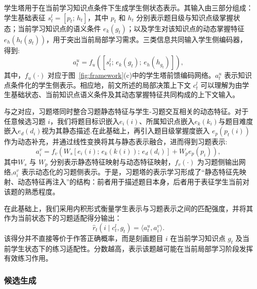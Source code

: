 \documentclass[11pt,a4paper]{article}
\begin{document}
学生塔用于在当前学习知识点条件下生成学生侧状态表示。其输入由三部分组成：学生基础表征 $s_t^l=[p_t;\,h_t]$，其中 $p_t$ 和 $h_t$ 分别表示题目级与知识点级掌握状态；当前学习知识点的语义条件 $e_k(g_t)$；以及学生对该知识点的动态掌握特征 $e_h(h_t(g_t))$，用于突出当前局部学习需求。三类信息共同输入学生侧编码器，得到:
\begin{equation}
a_t^{u}
=
f_u\!\left([s_t^l;\,e_k(g_t);\,
e_h(h_{g_t})]\right),
\end{equation}
其中，$f_u(\cdot)$ 对应于图~\ref{fig:framework}(c)中的学生塔前馈编码网络。$a_t^u$ 表示知识点条件化的学生侧表示。相应地，前文所述的局部决策上下文 $c_t^l$ 可以理解为由学生基础状态、当前知识点语义条件及其动态掌握特征共同构成的上下文输入。

与之对应，习题塔同时整合习题静态特征与学生-习题交互相关的动态特征。对于任意候选习题 $i$，我们将题目标识嵌入$e_i(i)$、所属知识点嵌入$e_k(k_i)$与题目难度嵌入$e_d(d_i)$视为其静态描述.在此基础上，再引入题目级掌握度嵌入 $e_p(p_t(i))$ 作为动态补充，并通过线性变换将其与静态表示融合，进而得到习题表示:
\begin{equation}
a_i^{v}
=
f_v\!\left(
W_s[e_i(i);\,
e_k(k(i));\,
e_d(d_i)]
+
W_p e_p(p_i)
\right),
\end{equation}
其中$W_s$ 与 $W_p$ 分别表示静态特征映射与动态特征映射，$f_v(\cdot)$ 为习题侧输出网络,$a_i^v$ 表示动态化的习题侧表示。于是，习题塔的表示学习形成了“静态特征先映射、动态特征再注入”的结构：前者用于描述题目本身，后者用于表征学生当前对该题的熟悉程度。

在此基础上，我们采用内积形式衡量学生表示与习题表示之间的匹配强度，并将其作为当前状态下的习题适配得分输出：
\begin{equation}
\hat{r}_{t}(i\mid c_t^l,g_t)=\langle a_t^{u},a_i^{v}\rangle.
\end{equation}
该得分并不直接等价于作答正确概率，而是刻画题目 $i$ 在当前学习知识点 $g_t$ 及当前学生状态下的练习适配性。分数越高，表示该题越可能在当前局部学习阶段发挥有效练习作用。
\subsubsection{候选生成}
\end{document}
